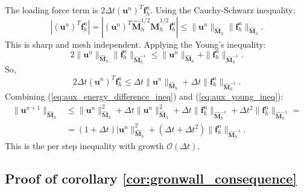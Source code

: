 \documentclass{article}
\renewcommand{\u}{\mathbf{u}}
\newcommand{\M}{\hat{\mathbf{M}}_h}
\begin{document}
The loading force term is $2\Delta t (\u^n)^T \mathbf{f}^n_h$. Using the Cauchy-Schwarz inequality:
\begin{equation}
    \nonumber
    \left|(\u^n)^T \mathbf{f}^n_h\right| = \left| (\u^n)^T\M^{1/2} \M^{1/2} \mathbf{f}^n_h \right| \leq \| \u^n \|_{\M} \|\mathbf{f}^n_h \|_{\M}.
\end{equation}
This is sharp and mesh independent. Applying the Young's inequality:
\begin{equation}
    \nonumber
    2 \| \u^n \|_{\M} \| \mathbf{f}^n_h \|_{\M^{-1}} \leq \| \u^n \|_{\M} + \| \mathbf{f}^n_h\|_{\M^{-1}}.
\end{equation}
So,
\begin{equation}\label{eq:aux_young_ineq}
    2 \Delta t (\u^n)^T \mathbf{f}_h^n \leq \Delta t \| \u^n \|_{\M} + \Delta t \| \mathbf{f}^n_h \|_{\M^{-1}}.
\end{equation}
Combining (\ref{eq:aux_energy_difference_ineq}) and (\ref{eq:aux_young_ineq}):
\begin{equation}
    \nonumber
    \begin{split}
        \| \u^{n+1} \|_{\M} &\leq \| \u^n \|^2_{\M} + \Delta t \| \u^n \|^2_{\M} + \Delta t \| \mathbf{f}^n_h \|_{\M^{-1}} + \Delta t^2 \| \mathbf{f}^n_h \|_{\M^{-1}} =\\
        &= (1+\Delta t) | \u^n \|^2_{\M}  + (\Delta t + \Delta t^2) \| \mathbf{f}^n_h \|_{\M^{-1}}.
    \end{split}
\end{equation}
This is the per step inequality with growth $\mathcal{O}(\Delta t)$.


\subsection{Proof of corollary \ref{cor:gronwall_consequence}}
\label{sec:proof_gronwall}
\end{document}
